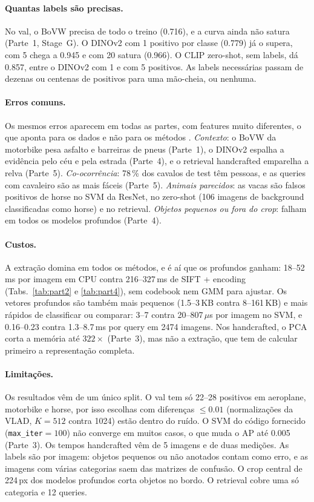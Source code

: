 \paragraph{Quantas labels são precisas.}
No val, o BoVW precisa de todo o treino (0.716), e a curva ainda não satura
(Parte~1, Stage~G). O DINOv2 com 1 positivo por classe (0.779) já o supera,
com 5 chega a 0.945 e com 20 satura (0.966). O CLIP zero-shot, sem labels, dá
0.857, entre o DINOv2 com 1 e com 5 positivos. As labels necessárias passam de
dezenas ou centenas de positivos para uma mão-cheia, ou nenhuma.

\paragraph{Erros comuns.}
Os mesmos erros aparecem em todas as partes, com features muito diferentes, o
que aponta para os dados e não para os métodos \cite{torralba2011}.
\emph{Contexto}: o BoVW da motorbike pesa asfalto e barreiras de pneus
(Parte~1), o DINOv2 espalha a evidência pelo céu e pela estrada (Parte~4), e o
retrieval handcrafted emparelha a relva (Parte~5). \emph{Co-ocorrência}: 78\,\%
dos cavalos de test têm pessoas, e as queries com cavaleiro são as mais
fáceis (Parte~5). \emph{Animais parecidos}: as vacas são falsos positivos de
horse no SVM da ResNet, no zero-shot (106 imagens de background classificadas
como horse) e no retrieval. \emph{Objetos pequenos ou fora do crop}: falham em
todos os modelos profundos (Parte~4).

\paragraph{Custos.}
A extração domina em todos os métodos, e é aí que os profundos ganham: 18--52\,ms
por imagem em CPU contra 216--327\,ms de SIFT + encoding
(Tabs.~\ref{tab:part2} e \ref{tab:part4}), sem codebook nem GMM para ajustar.
Os vetores profundos são também mais pequenos (1.5--3\,KB contra 8--161\,KB) e
mais rápidos de classificar ou comparar: 3--7 contra 20--807\,$\mu$s por imagem
no SVM, e 0.16--0.23 contra 1.3--8.7\,ms por query em 2474 imagens. Nos
handcrafted, o PCA corta a memória até $322\times$ (Parte~3), mas não a
extração, que tem de calcular primeiro a representação completa.

\paragraph{Limitações.}
Os resultados vêm de um único split. O val tem só 22--28 positivos em
aeroplane, motorbike e horse, por isso escolhas com diferenças $\le0.01$
(normalizações da VLAD, $K=512$ contra 1024) estão dentro do ruído. O SVM do
código fornecido (\texttt{max\_iter}$=100$) não converge em muitos casos, o que
muda o AP até 0.005 (Parte~3). Os tempos handcrafted vêm de 5 imagens e de
duas medições. As labels são por imagem: objetos pequenos ou não anotados
contam como erro, e as imagens com várias categorias saem das matrizes de
confusão. O crop central de 224\,px dos modelos profundos corta objetos no
bordo. O retrieval cobre uma só categoria e 12 queries.
